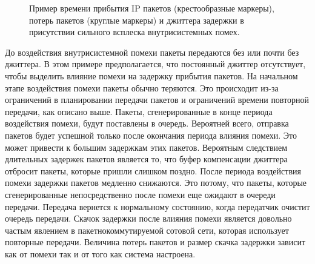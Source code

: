 \pgfplotsset{width=15cm, height=10cm, compat=1.3}
\begin{figure} [h]
  \center
{}
\caption{Пример времени прибытия IP пакетов (крестообразные маркеры), потерь пакетов (круглые маркеры) и джиттера задержки в присутствии сильного всплеска внутрисистемных помех.}
  \label{img:example_inter}
\end{figure}



До воздействия внутрисистемной помехи пакеты передаются без или почти без джиттера. В этом примере предполагается, что постоянный джиттер отсутствует, чтобы выделить влияние помехи на задержку прибытия пакетов.
На начальном этапе воздействия помехи пакеты обычно теряются. Это происходит из-за ограничений в планировании передачи пакетов и ограничений времени повторной передачи, как описано выше.
Пакеты, сгенерированные в конце периода воздействия помехи, будут поставлены в очередь. Вероятней всего, отправка пакетов будет успешной только после окончания периода влияния помехи. 
Это может привести к большим задержкам этих пакетов. 
Вероятным следствием длительных задержек пакетов является то, что буфер компенсации джиттера отбросит пакеты, которые пришли слишком поздно.
После периода воздействия помехи задержки пакетов медленно снижаются. Это потому, что пакеты, которые сгенерированные непосредственно после помехи еще ожидают в очереди передачи.
Передача вернется к нормальному состоянию, когда передатчик очистит очередь передачи.
Скачок задержки после влияния помехи является довольно частым явлением в пакетнокоммутируемой сотовой сети, которая использует повторные передачи. 
Величина потерь пакетов и размер скачка задержки зависит как от помехи так и от того как система настроена.

